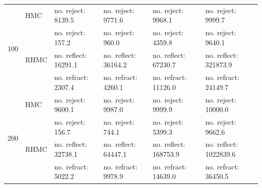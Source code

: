 \documentclass{article} %
\begin{document}
\begin {table}
\begin{tabular}{llllll}
\multirow{4}{*}{100}& HMC &  no. reject: 8139.5& no. reject: 9771.6 & no. reject: 9968.1& no. reject: 9999.7\vspace{3pt}\\
%
& \multirow{3}{*}{RHMC}& no. reject: 157.2& no. reject: 960.0& no. reject: 4359.8& no. reject: 9640.1\\ 
& &        no. reflect: 16291.1& no. reflect: 36164.2& no. reflect: 67230.7& no. reflect: 321873.9\\ 
& &          no. refract: 2307.4& no. refract: 4260.1& no. refract: 11126.0& no. refract: 24149.7\vspace{12pt}\\ 
\multirow{4}{*}{200}& HMC &  no. reject: 9600.1& no. reject: 9987.0 & no. reject: 9999.9& no. reject: 10000.0\vspace{3pt}\\
%
& \multirow{3}{*}{RHMC}& no. reject: 156.7& no. reject: 744.1& no. reject: 5399.3& no. reject: 9662.6\\ 
& &        no. reflect: 32738.1& no. reflect: 64447.1& no. reflect: 168753.9& no. reflect: 1022839.6\\ 
& &          no. refract: 5022.2& no. refract: 9978.9& no. refract: 14639.0& no. refract: 36450.5\vspace{12pt}\\ 
\hline \end{tabular}
\end{table}
\end{document}
